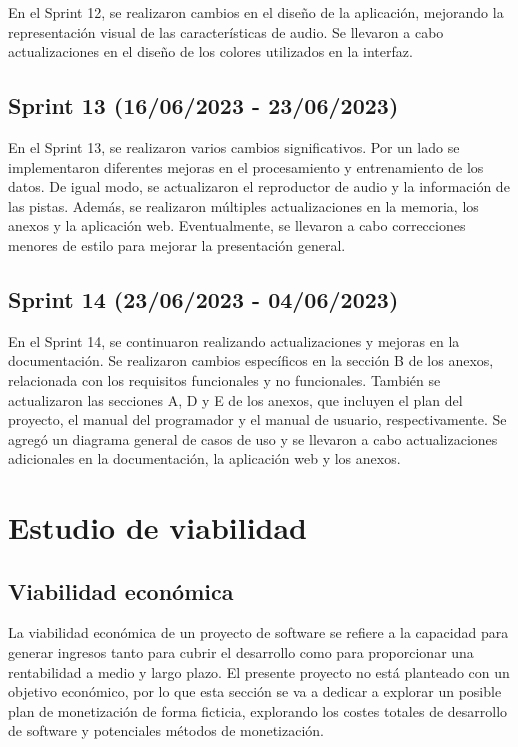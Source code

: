 En el Sprint 12, se realizaron cambios en el diseño de la aplicación, mejorando la representación visual de las características de audio. Se llevaron a cabo actualizaciones en el diseño de los colores utilizados en la interfaz.

\subsection{Sprint 13 (16/06/2023 - 23/06/2023)}

En el Sprint 13, se realizaron varios cambios significativos. Por un lado se implementaron diferentes mejoras en el procesamiento y entrenamiento de los datos. De igual modo, se actualizaron el reproductor de audio y la información de las pistas. Además, se realizaron múltiples actualizaciones en la memoria, los anexos y la aplicación web. Eventualmente, se llevaron a cabo correcciones menores de estilo para mejorar la presentación general.

\subsection{Sprint 14 (23/06/2023 - 04/06/2023)}

En el Sprint 14, se continuaron realizando actualizaciones y mejoras en la documentación. Se realizaron cambios específicos en la sección B de los anexos, relacionada con los requisitos funcionales y no funcionales. También se actualizaron las secciones A, D y E de los anexos, que incluyen el plan del proyecto, el manual del programador y el manual de usuario, respectivamente. Se agregó un diagrama general de casos de uso y se llevaron a cabo actualizaciones adicionales en la documentación, la aplicación web y los anexos.

\section{Estudio de viabilidad}

\subsection{Viabilidad económica}

La viabilidad económica de un proyecto de software se refiere a la capacidad para generar ingresos tanto para cubrir el desarrollo como para proporcionar una rentabilidad a medio y largo plazo. El presente proyecto no está planteado con un objetivo económico, por lo que esta sección se va a dedicar a explorar un posible plan de monetización de forma ficticia, explorando los costes totales de desarrollo de software y potenciales métodos de monetización.

